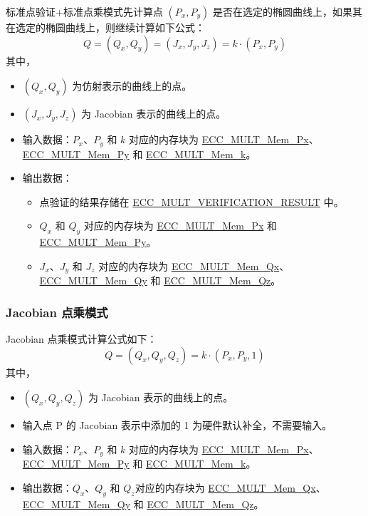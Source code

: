 \documentclass[main\_\_CN.tex]{subfiles}
\begin{document}
标准点验证+标准点乘模式先计算点 $(P_x,P_y)$ 是否在选定的椭圆曲线上，如果其在选定的椭圆曲线上，则继续计算如下公式：
\[
Q = (Q_x,Q_y) = (J_x,J_y,J_z) = k \cdot (P_x,P_y)
\]
其中，
\begin{itemize}
    \item $(Q_x,Q_y)$ 为仿射表示的曲线上的点。
    \item $(J_x,J_y,J_z)$ 为 Jacobian 表示的曲线上的点。
    \item 输入数据：$P_x$、$P_y$ 和 $k$ 对应的内存块为 \hyperref[tab:ecc-memory]{ECC\_MULT\_Mem\_Px}、\hyperref[tab:ecc-memory]{ECC\_MULT\_Mem\_Py} 和 \hyperref[tab:ecc-memory]{ECC\_MULT\_Mem\_k}。
    \item 输出数据：
    \begin{itemize}
        \item 点验证的结果存储在 \hyperref[fielddesc:ECCMULTVERIFICATIONRESULT]{ECC\_MULT\_VERIFICATION\_RESULT} 中。
        \item $Q_x$ 和 $Q_y$ 对应的内存块为 \hyperref[tab:ecc-memory]{ECC\_MULT\_Mem\_Px} 和 \hyperref[tab:ecc-memory]{ECC\_MULT\_Mem\_Py}。
        \item $J_x$、$J_y$ 和 $J_z$ 对应的内存块为 \hyperref[tab:ecc-memory]{ECC\_MULT\_Mem\_Qx}、\hyperref[tab:ecc-memory]{ECC\_MULT\_Mem\_Qy} 和 \hyperref[tab:ecc-memory]{ECC\_MULT\_Mem\_Qz}。
    \end{itemize}
\end{itemize}


\subsubsection{Jacobian 点乘模式}

Jacobian 点乘模式计算公式如下：
\[
Q = (Q_x,Q_y,Q_z) = k \cdot (P_x,P_y,1)
\]
其中，
\begin{itemize}
    \item $(Q_x,Q_y,Q_z)$ 为 Jacobian 表示的曲线上的点。
    \item 输入点 P 的 Jacobian 表示中添加的 1 为硬件默认补全，不需要输入。
    \item 输入数据：$P_x$、$P_y$ 和 $k$ 对应的内存块为 \hyperref[tab:ecc-memory]{ECC\_MULT\_Mem\_Px}、\hyperref[tab:ecc-memory]{ECC\_MULT\_Mem\_Py} 和 \hyperref[tab:ecc-memory]{ECC\_MULT\_Mem\_k}。
    \item 输出数据：$Q_x$、$Q_y$ 和 $Q_z$对应的内存块为 \hyperref[tab:ecc-memory]{ECC\_MULT\_Mem\_Qx}、\hyperref[tab:ecc-memory]{ECC\_MULT\_Mem\_Qy} 和 \hyperref[tab:ecc-memory]{ECC\_MULT\_Mem\_Qz}。
\end{itemize}
\end{document}
